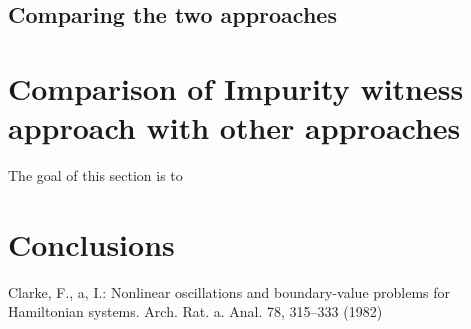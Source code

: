 \documentclass{llncs}
\begin{document}
\subsection{Comparing the two approaches}
\section{Comparison of Impurity witness approach with other approaches}
The goal of this section is to 

\section{Conclusions}
%

%
%
\begin{thebibliography}{5}
%
Clarke, F., a, I.:
Nonlinear oscillations and
boundary-value problems for Hamiltonian systems.
Arch. Rat. a. Anal. 78, 315--333 (1982)


\end{thebibliography}
\end{document}
